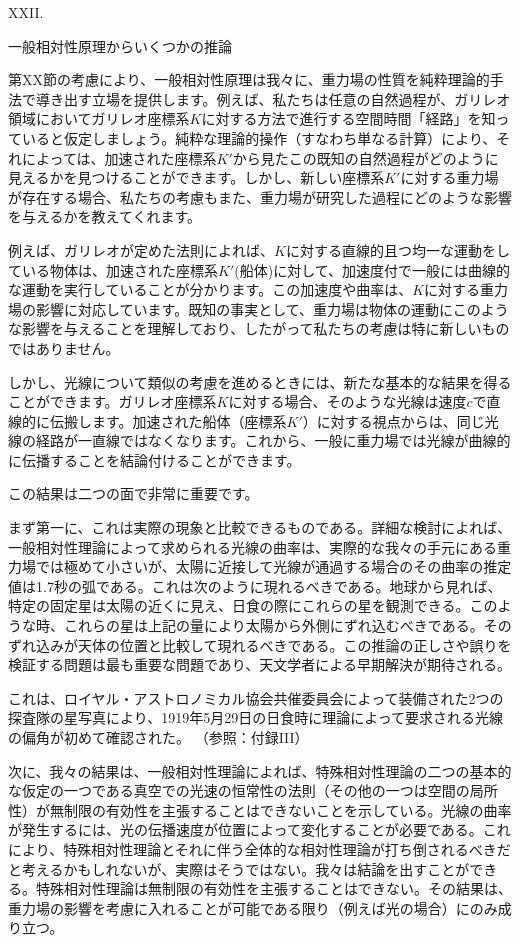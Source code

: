 \documentclass[a4paper,11pt,openany]{ltjsbook}
\begin{document}
XXII.

一般相対性原理からいくつかの推論

第XX節の考慮により、一般相対性原理は我々に、重力場の性質を純粋理論的手法で導き出す立場を提供します。例えば、私たちは任意の自然過程が、ガリレオ領域においてガリレオ座標系$K$に対する方法で進行する空間時間「経路」を知っていると仮定しましょう。純粋な理論的操作（すなわち単なる計算）により、それによっては、加速された座標系$K′$から見たこの既知の自然過程がどのように見えるかを見つけることができます。しかし、新しい座標系$K′$に対する重力場が存在する場合、私たちの考慮もまた、重力場が研究した過程にどのような影響を与えるかを教えてくれます。

例えば、ガリレオが定めた法則によれば、$K$に対する直線的且つ均一な運動をしている物体は、加速された座標系$K′$(船体)に対して、加速度付で一般には曲線的な運動を実行していることが分かります。この加速度や曲率は、$K$に対する重力場の影響に対応しています。既知の事実として、重力場は物体の運動にこのような影響を与えることを理解しており、したがって私たちの考慮は特に新しいものではありません。

しかし、光線について類似の考慮を進めるときには、新たな基本的な結果を得ることができます。ガリレオ座標系$K$に対する場合、そのような光線は速度$c$で直線的に伝搬します。加速された船体（座標系$K′$）に対する視点からは、同じ光線の経路が一直線ではなくなります。これから、一般に重力場では光線が曲線的に伝播することを結論付けることができます。

この結果は二つの面で非常に重要です。

まず第一に、これは実際の現象と比較できるものである。詳細な検討によれば、一般相対性理論によって求められる光線の曲率は、実際的な我々の手元にある重力場では極めて小さいが、太陽に近接して光線が通過する場合のその曲率の推定値は1.7秒の弧である。これは次のように現れるべきである。地球から見れば、特定の固定星は太陽の近くに見え、日食の際にこれらの星を観測できる。このような時、これらの星は上記の量により太陽から外側にずれ込むべきである。そのずれ込みが天体の位置と比較して現れるべきである。この推論の正しさや誤りを検証する問題は最も重要な問題であり、天文学者による早期解決が期待される。

 これは、ロイヤル・アストロノミカル協会共催委員会によって装備された2つの探査隊の星写真により、1919年5月29日の日食時に理論によって要求される光線の偏角が初めて確認された。 （参照：付録III）

次に、我々の結果は、一般相対性理論によれば、特殊相対性理論の二つの基本的な仮定の一つである真空での光速の恒常性の法則（その他の一つは空間の局所性）が無制限の有効性を主張することはできないことを示している。光線の曲率が発生するには、光の伝播速度が位置によって変化することが必要である。これにより、特殊相対性理論とそれに伴う全体的な相対性理論が打ち倒されるべきだと考えるかもしれないが、実際はそうではない。我々は結論を出すことができる。特殊相対性理論は無制限の有効性を主張することはできない。その結果は、重力場の影響を考慮に入れることが可能である限り（例えば光の場合）にのみ成り立つ。
\end{document}
